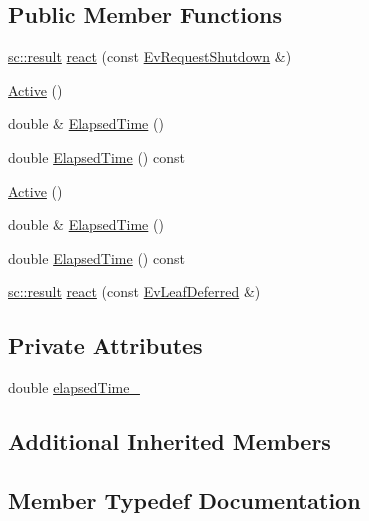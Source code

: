\subsection*{Public Member Functions}
\begin{DoxyCompactItemize}
\item 
\mbox{\hyperlink{namespaceboost_1_1statechart_abe807f6598b614d6d87bb951ecd92331}{sc\+::result}} \mbox{\hyperlink{struct_active_afe9a0390ef2231d6e36bc7ca49e5220a}{react}} (const \mbox{\hyperlink{struct_ev_request_shutdown}{Ev\+Request\+Shutdown}} \&)
\item 
\mbox{\hyperlink{struct_active_aa276bfdc4f8f0ec3fd8a8a3a2cedab1e}{Active}} ()
\item 
double \& \mbox{\hyperlink{struct_active_a61b84526303d31ed5d4d0b64efa15996}{Elapsed\+Time}} ()
\item 
double \mbox{\hyperlink{struct_active_adc392561063b506262e24bca87a74f43}{Elapsed\+Time}} () const
\item 
\mbox{\hyperlink{struct_active_aa276bfdc4f8f0ec3fd8a8a3a2cedab1e}{Active}} ()
\item 
double \& \mbox{\hyperlink{struct_active_a61b84526303d31ed5d4d0b64efa15996}{Elapsed\+Time}} ()
\item 
double \mbox{\hyperlink{struct_active_adc392561063b506262e24bca87a74f43}{Elapsed\+Time}} () const
\item 
\mbox{\hyperlink{namespaceboost_1_1statechart_abe807f6598b614d6d87bb951ecd92331}{sc\+::result}} \mbox{\hyperlink{struct_active_a173c792f4e486c497ad10ebc5add135e}{react}} (const \mbox{\hyperlink{struct_ev_leaf_deferred}{Ev\+Leaf\+Deferred}} \&)
\end{DoxyCompactItemize}
\subsection*{Private Attributes}
\begin{DoxyCompactItemize}
\item 
double \mbox{\hyperlink{struct_active_a3f50dfab6f5983a20aedd5a3cb6a49c9}{elapsed\+Time\+\_\+}}
\end{DoxyCompactItemize}
\subsection*{Additional Inherited Members}


\subsection{Member Typedef Documentation}
\mbox{\label{struct_active_a628dd827d0faf3cd002f59a8d17f189d}} 
